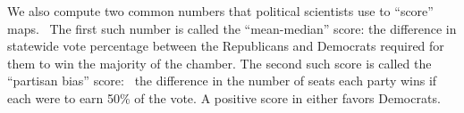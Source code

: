 \documentclass[letterpaper]{article}
\newcommand\textstylenormaltextrun[1]{#1}
\newcommand\textstyleeop[1]{#1}
\begin{document}
\bigskip


We also compute two common numbers that political scientists use to ``score'' maps. \ The first such number is called
the ``mean-median'' score: the difference in statewide vote percentage between the Republicans and Democrats required for them 
to win the majority of the chamber. %
The second such score is called the ``partisan bias'' score: \ the difference in the number of seats each party wins if
each were to earn 50\% of the vote. A positive score in either favors Democrats.
\end{document}
